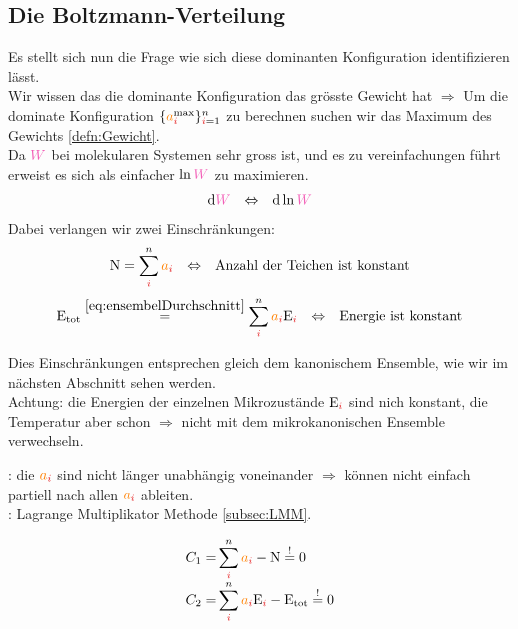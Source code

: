\subsection{Die Boltzmann-Verteilung}
\begin{sectionbox}\nospacing
  Es stellt sich nun die Frage wie sich diese dominanten Konfiguration identifizieren lässt. \\
  Wir wissen das die dominante Konfiguration das grösste Gewicht hat
  $\Rightarrow$ Um die dominate Konfiguration $\{\mca_{\idxi}^{\max}\}_{\idxi=1}^n$ zu berechnen suchen wir das Maximum des
  Gewichts \cref{defn:Gewicht}.\\
  Da $\Wg$ bei molekularen Systemen sehr gross ist, und es zu vereinfachungen führt erweist es sich als einfacher $\ln\Wg$ zu maximieren.
  \begin{align*}
    \diff\Wg&&\Leftrightarrow&&\diff\ln\Wg
  \end{align*}
  Dabei verlangen wir zwei Einschränkungen:
  \begin{align}
    \Nz=\sum_{\idxi}^n\mca_{\idxi}&&\Leftrightarrow&&\text{Anzahl der Teichen ist konstant}
  \end{align}
  \begin{align}
  \Ez_{\text{tot}}\eqs{\cref{eq:ensembelDurchschnitt}}\sum_{\idxi}^n\mca_{\idxi}\Ez_{\idxi}&&\Leftrightarrow&&
    \text{Energie ist konstant}
  \end{align}
  \begin{notebox}[Bemerkung]\nospacing
    Dies Einschränkungen entsprechen gleich dem kanonischem Ensemble, wie wir im
    nächsten Abschnitt sehen werden.\\
    Achtung: die Energien der einzelnen Mikrozustände $\Ez_{\idxi}$ sind nich
    konstant, die Temperatur aber schon $\Rightarrow$ nicht mit dem mikrokanonischen Ensemble verwechseln.
  \end{notebox}
  : die $\mca_{\idxi}$ sind nicht länger unabhängig voneinander $\Rightarrow$ können nicht einfach partiell nach allen $\mca_{\idxi}$
  ableiten.\\
  : Lagrange Multiplikator Methode \cref{subsec:LMM}.
\end{sectionbox}
\begin{sectionbox}[Zwangsbedingungen]\nospacing
  \begin{align}
    C_1=&\sum_{\idxi}^n\mca_{\idxi}-\Nz\eqs{!}0\nalign
    C_2=&\sum_{\idxi}^n\mca_{\idxi}\Ez_{\idxi}-\Ez_{\text{tot}}\eqs{!}0
  \end{align}
\end{sectionbox}
